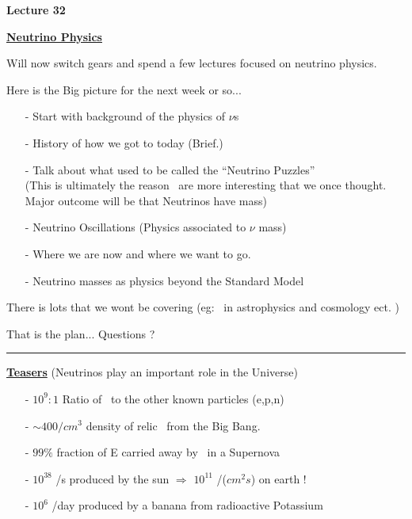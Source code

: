 



\thispagestyle{fancy}

\begin{center}
{\huge \textbf{Lecture 32}}
\end{center}

{\fontsize{14}{16}\selectfont

\textbf{\underline{Neutrino Physics}} 

Will now switch gears and spend a few lectures focused on neutrino physics. 

Here is the Big picture for the next week or so...

\begin{itemize}
\item[-] Start with background of the physics of $\nu$s
\item[-] History of how we got to today (Brief.)
\item[-] Talk about what used to be called the ``Neutrino Puzzles''\\
          (This is ultimately the reason \nus\ are more interesting that we once thought.\\ Major outcome will be that Neutrinos have mass)
\item[-] Neutrino Oscillations (Physics associated to $\nu$ mass)
\item[-] Where we are now and where we want to go.
\item[-] Neutrino masses as physics beyond the Standard Model\\
\end{itemize}

There is lots that we wont be covering (eg: \nus\ in astrophysics and cosmology ect. )

\vspace*{0.4in}

That is the plan... Questions ?

\vspace*{0.2in}

\noindent\rule{\textwidth}{1pt}

\textbf{\underline{Teasers}} (Neutrinos play an important role in the Universe)

\begin{itemize}
\item[-] $10^9:1$ Ratio of \nus\ to the other known particles (e,p,n)
\item[-] $\sim400/cm^3$ density of relic \nus\ from the Big Bang.
\item[-] $99\%$ fraction of E carried away by \nus\ in a Supernova
\item[-] $10^{38}$ \nus/s produced by the sun $\Rightarrow$ $10^{11}$ \nus/($cm^2s$) on earth !
\item[-] $10^6$ \nus/day produced by a banana from radioactive Potassium
\end{itemize}

}

